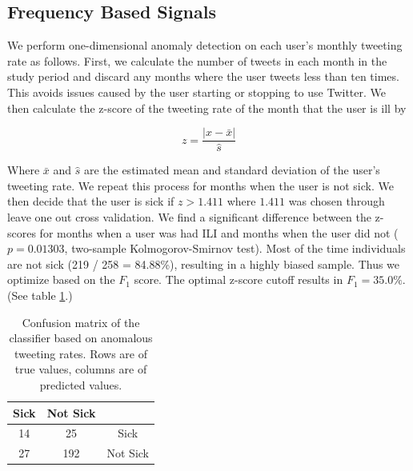 \documentclass{acm_proc_article-sp}
\begin{document}
\subsection{Frequency Based Signals}

We perform one-dimensional anomaly detection on each user's monthly tweeting rate as follows. First, we calculate the number of tweets in each month in the study period and discard any months where the user tweets less than ten times. This avoids issues caused by the user starting or stopping to use Twitter. We then calculate the z-score of the tweeting rate of the month that the user is ill by

\begin{equation}
z = \frac{|x - \bar{x}|}{\hat{s}}
\end{equation}

Where \(\bar{x}\) and \(\hat{s}\) are the estimated mean and standard deviation of the user's tweeting rate. \cite{Grubs:1969ab} We repeat this process for months when the user is not sick. We then decide that the user is sick if \(z > 1.411\) where \(1.411\) was chosen through leave one out cross validation. We find a significant difference between the z-scores for months when a user was had ILI and months when the user did not (\(p = 0.01303\), two-sample Kolmogorov-Smirnov test). Most of the time individuals are not sick (219 / 258 = 84.88\%), resulting in a highly biased sample. Thus we optimize based on the \(F_1\) score. The optimal z-score cutoff results in \(F_1= 35.0\%\). (See table \ref{tab:tweet_anomaly_confusion}.) 




\begin{table}
\centering
\begin{tabular}{|c|c|c|} \hline
Sick&Not Sick&\ \\ \hline
14 & 25 & Sick\\ \hline
27 & 192 & Not Sick\\
\hline\end{tabular}
\caption{Confusion matrix of the classifier based on anomalous tweeting rates. Rows are of true values, columns are of predicted values.}
\label{tab:tweet_anomaly_confusion}
\end{table}
\end{document}
